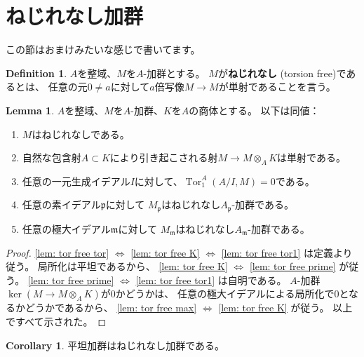 \documentclass[uplatex]{jsarticle}
\theoremstyle{definition}
\newtheorem{cor}[cor]{Corollary}
\newtheorem{lem}[lem]{Lemma}
\newtheorem{defi}[defi]{Definition}
\theoremstyle{plain}
\DeclareMathOperator{\Tor}{\mathrm{Tor}}
\begin{document}
\section{ねじれなし加群}

この節はおまけみたいな感じで書いてます。


\begin{defi}
  \(A\)を整域、\(M\)を\(A\)-加群とする。
  \(M\)が\textbf{ねじれなし} (torsion free)であるとは、
  任意の元\(0\neq a\)に対して\(a\)倍写像\(M\to M\)が単射であることを言う。
\end{defi}

\begin{lem}\label{lem: tor free}
  \(A\)を整域、\(M\)を\(A\)-加群、\(K\)を\(A\)の商体とする。
  以下は同値：
  \begin{enumerate}
    \item \label{lem: tor free tor}
    \(M\)はねじれなしである。
    \item \label{lem: tor free K}
    自然な包含射\(A\subset K\)により引き起こされる射\(M\to M\otimes_AK\)は単射である。
    \item \label{lem: tor free tor1}
    任意の一元生成イデアル\(I\)に対して、\(\Tor_1^A(A/I,M)=0\)である。
    \item \label{lem: tor free prime}
    任意の素イデアル\(\mathfrak{p}\)に対して
    \(M_{\mathfrak{p}}\)はねじれなし\(A_{\mathfrak{p}}\)-加群である。
    \item \label{lem: tor free max}
    任意の極大イデアル\(\mathfrak{m}\)に対して
    \(M_{\mathfrak{m}}\)はねじれなし\(A_{\mathfrak{m}}\)-加群である。
  \end{enumerate}
\end{lem}

\begin{proof}
  \ref{lem: tor free tor} \(\Leftrightarrow\) \ref{lem: tor free K}
  \(\Leftrightarrow\) \ref{lem: tor free tor1}
  は定義より従う。
  局所化は平坦であるから、
  \ref{lem: tor free K} \(\Leftrightarrow\) \ref{lem: tor free prime}
  が従う。
  \ref{lem: tor free prime} \(\Leftrightarrow\) \ref{lem: tor free tor1}
  は自明である。
  \(A\)-加群\(\ker(M\to M\otimes_AK)\)が\(0\)かどうかは、
  任意の極大イデアルによる局所化で\(0\)となるかどうかであるから、
  \ref{lem: tor free max} \(\Leftrightarrow\) \ref{lem: tor free K}
  が従う。
  以上ですべて示された。
\end{proof}

\begin{cor}
  平坦加群はねじれなし加群である。
\end{cor}
\end{document}
